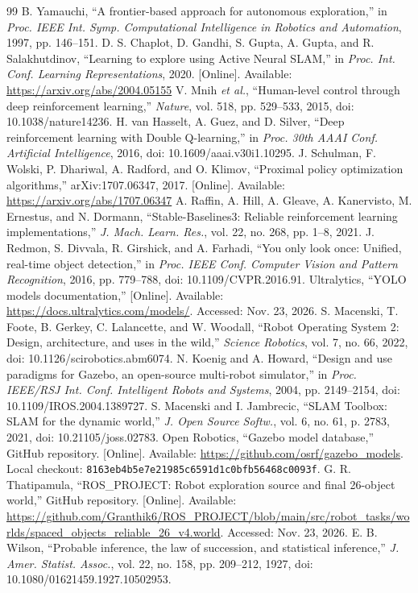 \documentclass[conference]{IEEEtran}
\begin{document}
\begin{thebibliography}{99}
 B. Yamauchi, ``A frontier-based approach for autonomous exploration,'' in \emph{Proc. IEEE Int. Symp. Computational Intelligence in Robotics and Automation}, 1997, pp. 146--151.
 D. S. Chaplot, D. Gandhi, S. Gupta, A. Gupta, and R. Salakhutdinov, ``Learning to explore using Active Neural SLAM,'' in \emph{Proc. Int. Conf. Learning Representations}, 2020. [Online]. Available: \url{https://arxiv.org/abs/2004.05155}
 V. Mnih \emph{et al.}, ``Human-level control through deep reinforcement learning,'' \emph{Nature}, vol. 518, pp. 529--533, 2015, doi: 10.1038/nature14236.
 H. van Hasselt, A. Guez, and D. Silver, ``Deep reinforcement learning with Double Q-learning,'' in \emph{Proc. 30th AAAI Conf. Artificial Intelligence}, 2016, doi: 10.1609/aaai.v30i1.10295.
 J. Schulman, F. Wolski, P. Dhariwal, A. Radford, and O. Klimov, ``Proximal policy optimization algorithms,'' arXiv:1707.06347, 2017. [Online]. Available: \url{https://arxiv.org/abs/1707.06347}
 A. Raffin, A. Hill, A. Gleave, A. Kanervisto, M. Ernestus, and N. Dormann, ``Stable-Baselines3: Reliable reinforcement learning implementations,'' \emph{J. Mach. Learn. Res.}, vol. 22, no. 268, pp. 1--8, 2021.
 J. Redmon, S. Divvala, R. Girshick, and A. Farhadi, ``You only look once: Unified, real-time object detection,'' in \emph{Proc. IEEE Conf. Computer Vision and Pattern Recognition}, 2016, pp. 779--788, doi: 10.1109/CVPR.2016.91.
 Ultralytics, ``YOLO models documentation,'' [Online]. Available: \url{https://docs.ultralytics.com/models/}. Accessed: Nov. 23, 2026.
 S. Macenski, T. Foote, B. Gerkey, C. Lalancette, and W. Woodall, ``Robot Operating System 2: Design, architecture, and uses in the wild,'' \emph{Science Robotics}, vol. 7, no. 66, 2022, doi: 10.1126/scirobotics.abm6074.
 N. Koenig and A. Howard, ``Design and use paradigms for Gazebo, an open-source multi-robot simulator,'' in \emph{Proc. IEEE/RSJ Int. Conf. Intelligent Robots and Systems}, 2004, pp. 2149--2154, doi: 10.1109/IROS.2004.1389727.
 S. Macenski and I. Jambrecic, ``SLAM Toolbox: SLAM for the dynamic world,'' \emph{J. Open Source Softw.}, vol. 6, no. 61, p. 2783, 2021, doi: 10.21105/joss.02783.
 Open Robotics, ``Gazebo model database,'' GitHub repository. [Online]. Available: \url{https://github.com/osrf/gazebo_models}. Local checkout: \texttt{8163eb4b5e7e21985c6591d1c0bfb56468c0093f}.
 G. R. Thatipamula, ``ROS\_PROJECT: Robot exploration source and final 26-object world,'' GitHub repository. [Online]. Available: \url{https://github.com/Granthik6/ROS_PROJECT/blob/main/src/robot_tasks/worlds/spaced_objects_reliable_26_v4.world}. Accessed: Nov. 23, 2026.
 E. B. Wilson, ``Probable inference, the law of succession, and statistical inference,'' \emph{J. Amer. Statist. Assoc.}, vol. 22, no. 158, pp. 209--212, 1927, doi: 10.1080/01621459.1927.10502953.
\end{thebibliography}
\end{document}
